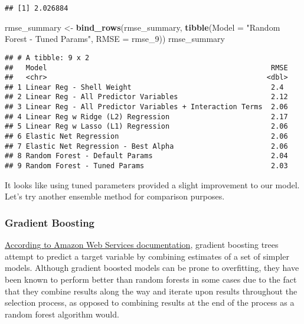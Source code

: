 \documentclass[
]{article}
\newenvironment{Shaded}{\begin{snugshade}}{\end{snugshade}}
\newcommand{\AttributeTok}[1]{\textcolor[rgb]{0.13,0.29,0.53}{#1}}
\newcommand{\FunctionTok}[1]{\textcolor[rgb]{0.13,0.29,0.53}{\textbf{#1}}}
\newcommand{\NormalTok}[1]{#1}
\newcommand{\OtherTok}[1]{\textcolor[rgb]{0.56,0.35,0.01}{#1}}
\newcommand{\StringTok}[1]{\textcolor[rgb]{0.31,0.60,0.02}{#1}}
\begin{document}
\begin{verbatim}
## [1] 2.026884
\end{verbatim}

\begin{Shaded}
\begin{Highlighting}[]
\NormalTok{rmse\_summary }\OtherTok{\textless{}{-}} \FunctionTok{bind\_rows}\NormalTok{(rmse\_summary,}
                          \FunctionTok{tibble}\NormalTok{(}\AttributeTok{Model =} \StringTok{"Random Forest {-} Tuned Params"}\NormalTok{,}
                                 \AttributeTok{RMSE =}\NormalTok{ rmse\_9))}
\NormalTok{rmse\_summary}
\end{Highlighting}
\end{Shaded}

\begin{verbatim}
## # A tibble: 9 x 2
##   Model                                                     RMSE
##   <chr>                                                    <dbl>
## 1 Linear Reg - Shell Weight                                 2.4 
## 2 Linear Reg - All Predictor Variables                      2.12
## 3 Linear Reg - All Predictor Variables + Interaction Terms  2.06
## 4 Linear Reg w Ridge (L2) Regression                        2.17
## 5 Linear Reg w Lasso (L1) Regression                        2.06
## 6 Elastic Net Regression                                    2.06
## 7 Elastic Net Regression - Best Alpha                       2.06
## 8 Random Forest - Default Params                            2.04
## 9 Random Forest - Tuned Params                              2.03
\end{verbatim}

It looks like using tuned parameters provided a slight improvement to
our model. Let's try another ensemble method for comparison purposes.

\hypertarget{gradient-boosting}{%
\subsubsection{Gradient Boosting}\label{gradient-boosting}}

\href{https://docs.aws.amazon.com/sagemaker/latest/dg/xgboost-HowItWorks.html}{According
to Amazon Web Services documentation}, gradient boosting trees attempt
to predict a target variable by combining estimates of a set of simpler
models. Although gradient boosted models can be prone to overfitting,
they have been known to perform better than random forests in some cases
due to the fact that they combine results along the way and iterate upon
results throughout the selection process, as opposed to combining
results at the end of the process as a random forest algorithm would.
\end{document}
